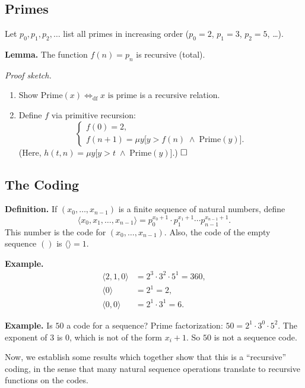 \documentclass[11pt]{article}
\begin{document}
\subsection{Primes}

Let $p_0, p_1, p_2, \dots$ list all primes in increasing order ($p_0 = 2$, $p_1 = 3$, $p_2 = 5$, \dots).

\textbf{Lemma.} The function $f(n) = p_n$ is recursive (total).

\textit{Proof sketch.}
\begin{enumerate}[leftmargin=1.8em, label=(\arabic*)]
    \item Show $\mathrm{Prime}(x) \iff_{\mathrm{df}} x \text{ is prime}$ is a recursive relation.
    \item Define $f$ via primitive recursion:
    \[
        \begin{cases} f(0) = 2, \\ f(n+1) = \mu y\bigl[y > f(n) \;\land\; \mathrm{Prime}(y)\bigr]. \end{cases}
    \]
    (Here, $h(t, n) = \mu y\bigl[y > t \;\land\; \mathrm{Prime}(y)\bigr]$.) $\hfill\square$
\end{enumerate}

\subsection{The Coding}

\textbf{Definition.} If $(x_0, \dots, x_{n-1})$ is a finite sequence of natural numbers, define
\[
    \langle x_0, x_1, \dots, x_{n-1}\rangle = p_0^{x_0+1} \cdot p_1^{x_1+1} \cdots p_{n-1}^{x_{n-1}+1}.
\]
This number is the code for $(x_0, \dots, x_{n-1})$. Also, the code of the empty sequence $()$ is $\langle\rangle = 1$.

\textbf{Example.}
\begin{align*}
    \langle 2, 1, 0 \rangle &= 2^3 \cdot 3^2 \cdot 5^1 = 360, \\
    \langle 0 \rangle &= 2^1 = 2, \\
    \langle 0, 0 \rangle &= 2^1 \cdot 3^1 = 6.
\end{align*}

\textbf{Example.} Is $50$ a code for a sequence? Prime factorization: $50 = 2^1 \cdot 3^0 \cdot 5^2$. The exponent of $3$ is $0$, which is not of the form $x_i + 1$. So $50$ is not a sequence code.

Now, we establish some results which together show that this is a ``recursive'' coding, in the sense that many natural sequence operations translate to recursive functions on the codes.
\end{document}
